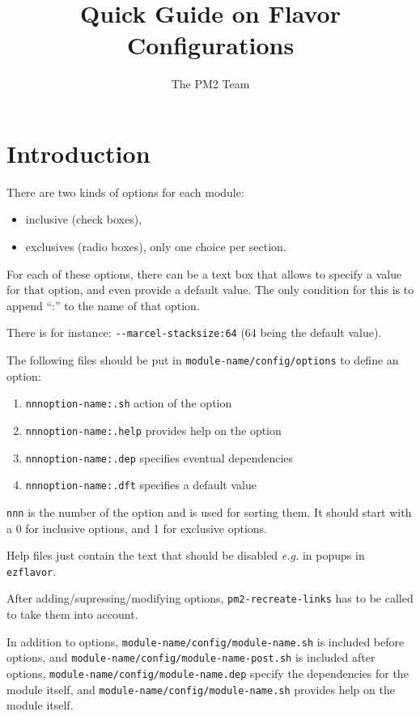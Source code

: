 \documentclass[11pt, a4paper ,twoside]{article}
\begin{document}
\title{Quick Guide on Flavor Configurations}
\author{The PM2 Team}
\date{}
\maketitle

\section{Introduction}

There are two kinds of options for each module:
\begin{itemize}
\item inclusive (check boxes),
\item exclusives (radio boxes), only one choice per section.
\end{itemize}

For each of these options, there can be a text box that allows to
specify a value for that option, and even provide a default value.
The only condition for this is to append ``:'' to the name of that
option.

There is for instance: \verb|--marcel-stacksize:64| (64 being the
default value).

The following files should be put in \verb|module-name/config/options| to
define an option:
\begin{enumerate}
\item \verb|nnnoption-name:.sh| action of the option
\item \verb|nnnoption-name:.help| provides help on the option
\item \verb|nnnoption-name:.dep| specifies eventual dependencies
\item \verb|nnnoption-name:.dft| specifies a default value
\end{enumerate}

\verb+nnn+ is the number of the option and is used for sorting them. It
should start with a 0 for inclusive options, and 1 for exclusive
options.

Help files just contain the text that should be disabled \emph{e.g.} in
popups in \verb+ezflavor+.

After adding/supressing/modifying options, \verb+pm2-recreate-links+ has
to be called to take them into account.

In addition to options, \verb+module-name/config/module-name.sh+
is included before options, and
\verb+module-name/config/module-name-post.sh+ is included after options,
\verb+module-name/config/module-name.dep+ specify the dependencies for
the module itself, and \verb+module-name/config/module-name.sh+ provides
help on the module itself.
\end{document}
